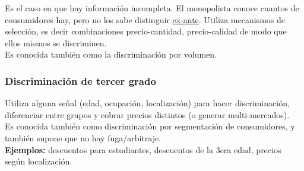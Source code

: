 Es el caso en que hay información incompleta. El monopolista conoce cuantos  de consumidores hay, pero no los sabe distinguir \hyperlink{ex-ante}{ex-ante}. Utiliza mecanismos de selección, es decir combinaciones precio-cantidad, precio-calidad de modo que ellos mismos se discriminen.\\


Es conocida también como la discriminación por volumen.

\subsubsection{Discriminación de tercer grado}
Utiliza alguna señal (edad, ocupación, localización) para hacer discriminación, diferenciar entre grupos y cobrar precios distintos (o generar multi-mercados).\\

Es conocida también como discriminación por segmentación de consumidores, y también supone que no hay fuga/arbitraje.\\

\textbf{Ejemplos:} descuentos para estudiantes, descuentos de la 3era edad, precios según localización.


\newpage